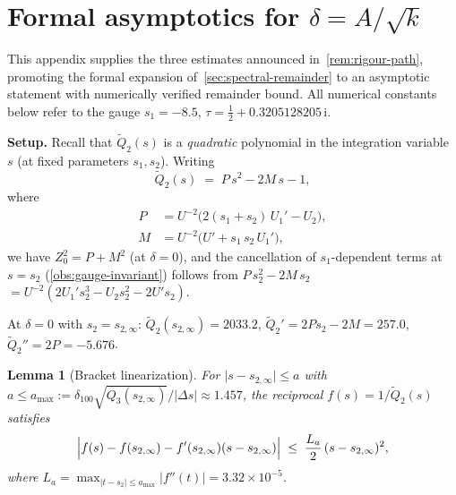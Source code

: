 \documentclass[11pt,a4paper]{article}
\theoremstyle{plain}
\newtheorem{lemma}[theorem]{Lemma}
\theoremstyle{definition}
\theoremstyle{remark}
\newcommand{\ii}{\mathrm{i}}
\begin{document}

\section{Formal asymptotics for \texorpdfstring{$\delta = A/\!\sqrt{k}$}{δ=A/√k}}%
\label{app:rigorous}

This appendix supplies the three estimates announced
in~\cref{rem:rigour-path}, promoting the formal
expansion of~\cref{sec:spectral-remainder} to an
asymptotic statement with numerically verified
remainder bound.  All numerical constants
below refer to the gauge $s_1 = -8.5$,
$\tau = \frac12 + 0.3205128205\,\ii$.

\medskip
\noindent\textbf{Setup.}
Recall that $\tilde Q_2(s)$ is a \emph{quadratic} polynomial
in the integration variable~$s$ (at fixed parameters $s_1,s_2$).
Writing
\begin{equation}\label{eq:Qt2-quad}
  \tilde Q_2(s) \;=\; P\,s^2 - 2M\,s - 1,
\end{equation}
where
\begin{align}
  P &= U^{-2}\bigl(2(s_1+s_2)\,U_1' - U_2\bigr),
  \label{eq:P-coeff} \\
  M &= U^{-2}\bigl(U' + s_1\,s_2\,U_1'\bigr),
  \label{eq:M-coeff}
\end{align}
we have $Z_0^2 = P + M^2$ (at $\delta=0$), and
the cancellation of $s_1$-dependent terms at $s = s_2$
(\cref{obs:gauge-invariant}) follows from
$P\,s_2^2 - 2M\,s_2$
$= U^{-2}(2U_1' s_2^3 - U_2 s_2^2 - 2U' s_2)$.

\smallskip
At $\delta = 0$ with $s_2 = s_{2,\infty}$:
$\tilde Q_2(s_{2,\infty}) = 2033.2$, \;
$\tilde Q_2' = 2Ps_2 - 2M = 257.0$, \;
$\tilde Q_2'' = 2P = -5.676$.

\begin{lemma}[Bracket linearization]\label{lem:bracket}
  For $\lvert s - s_{2,\infty}\rvert \le a$
  with $a \le a_{\max} := \delta_{\!100}\sqrt{Q_3(s_{2,\infty})}/\lvert\Delta s\rvert
  \approx 1.457$,
  the reciprocal $f(s) = 1/\tilde Q_2(s)$ satisfies
  \[
    \Bigl\lvert f(s) - f(s_{2,\infty})
      - f'(s_{2,\infty})(s - s_{2,\infty})\Bigr\rvert
    \;\le\; \frac{L_a}{2}\,(s - s_{2,\infty})^2,
  \]
  where $L_a = \max_{\lvert t - s_{2}\rvert \le a_{\max}}
  \lvert f''(t)\rvert = 3.32 \times 10^{-5}$.
\end{lemma}
\end{document}
